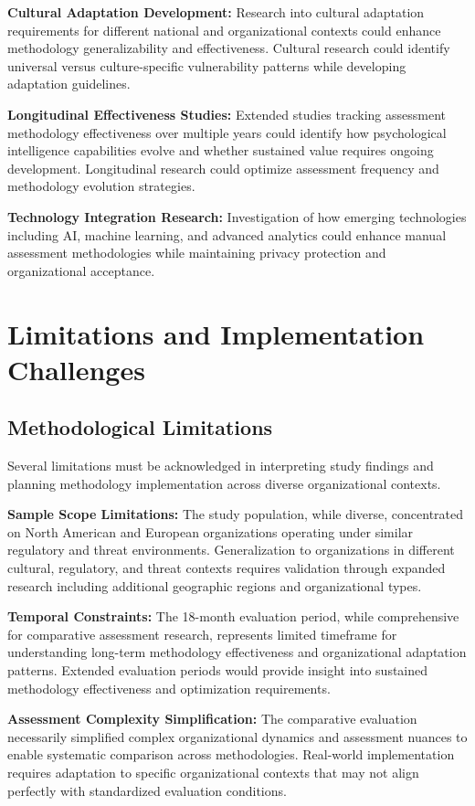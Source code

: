 \documentclass[10pt, twocolumn]{article}
\begin{document}
\textbf{Cultural Adaptation Development:} Research into cultural adaptation requirements for different national and organizational contexts could enhance methodology generalizability and effectiveness. Cultural research could identify universal versus culture-specific vulnerability patterns while developing adaptation guidelines.

\textbf{Longitudinal Effectiveness Studies:} Extended studies tracking assessment methodology effectiveness over multiple years could identify how psychological intelligence capabilities evolve and whether sustained value requires ongoing development. Longitudinal research could optimize assessment frequency and methodology evolution strategies.

\textbf{Technology Integration Research:} Investigation of how emerging technologies including AI, machine learning, and advanced analytics could enhance manual assessment methodologies while maintaining privacy protection and organizational acceptance.

\section{Limitations and Implementation Challenges}

\subsection{Methodological Limitations}

Several limitations must be acknowledged in interpreting study findings and planning methodology implementation across diverse organizational contexts.

\textbf{Sample Scope Limitations:} The study population, while diverse, concentrated on North American and European organizations operating under similar regulatory and threat environments. Generalization to organizations in different cultural, regulatory, and threat contexts requires validation through expanded research including additional geographic regions and organizational types.

\textbf{Temporal Constraints:} The 18-month evaluation period, while comprehensive for comparative assessment research, represents limited timeframe for understanding long-term methodology effectiveness and organizational adaptation patterns. Extended evaluation periods would provide insight into sustained methodology effectiveness and optimization requirements.

\textbf{Assessment Complexity Simplification:} The comparative evaluation necessarily simplified complex organizational dynamics and assessment nuances to enable systematic comparison across methodologies. Real-world implementation requires adaptation to specific organizational contexts that may not align perfectly with standardized evaluation conditions.
\end{document}
